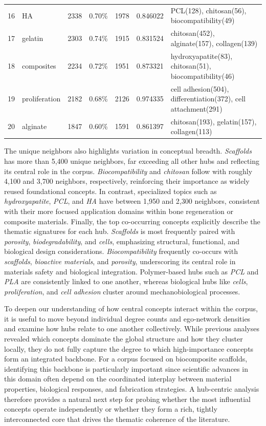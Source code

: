 \documentclass{article}
\begin{document}
\begin{table}[htbp]
\begin{tabular}{clrrrrl}
16 & HA & 2338 & 0.70\% & 1978 & 0.846022 & PCL(128), chitosan(56), biocompatibility(49) \\
17 & gelatin & 2303 & 0.74\% & 1915 & 0.831524 & chitosan(452), alginate(157), collagen(139) \\
18 & composites & 2234 & 0.72\% & 1951 & 0.873321 & hydroxyapatite(83), chitosan(51), biocompatibility(46) \\
19 & proliferation & 2182 & 0.68\% & 2126 & 0.974335 & cell adhesion(504), differentiation(372), cell attachment(291) \\
20 & alginate & 1847 & 0.60\% & 1591 & 0.861397 & chitosan(193), gelatin(157), collagen(113) \\
\hline
\end{tabular}
\end{table}

The unique neighbors also highlights variation in conceptual breadth. \textit{Scaffolds} has more than 5{,}400 unique neighbors, far exceeding all other hubs and reflecting its central role in the corpus. \textit{Biocompatibility} and \textit{chitosan} follow with roughly 4{,}100 and 3{,}700 neighbors, respectively, reinforcing their importance as widely reused foundational concepts. In contrast, specialized topics such as \textit{hydroxyapatite}, \textit{PCL}, and \textit{HA} have between 1{,}950 and 2{,}300 neighbors, consistent with their more focused application domains within bone regeneration or composite materials. Finally, the top co-occurring concepts explicitly describe the thematic signatures for each hub. \textit{Scaffolds} is most frequently paired with \textit{porosity}, \textit{biodegradability}, and \textit{cells}, emphasizing structural, functional, and biological design considerations. \textit{Biocompatibility} frequently co-occurs with \textit{scaffolds}, \textit{bioactive materials}, and \textit{porosity}, underscoring its central role in materials safety and biological integration. Polymer-based hubs such as \textit{PCL} and \textit{PLA} are consistently linked to one another, whereas biological hubs like \textit{cells}, \textit{proliferation}, and \textit{cell adhesion} cluster around mechanobiological processes.

To deepen our understanding of how central concepts interact within the corpus, it is useful to move beyond individual degree counts and ego-network densities and examine how hubs relate to one another collectively. While previous analyses revealed which concepts dominate the global structure and how they cluster locally, they do not fully capture the degree to which high-importance concepts form an integrated backbone. For a corpus focused on biocomposite scaffolds, identifying this backbone is particularly important since scientific advances in this domain often depend on the coordinated interplay between material properties, biological responses, and fabrication strategies. A hub-centric analysis therefore provides a natural next step for probing whether the most influential concepts operate independently or whether they form a rich, tightly interconnected core that drives the thematic coherence of the literature.
\end{document}
